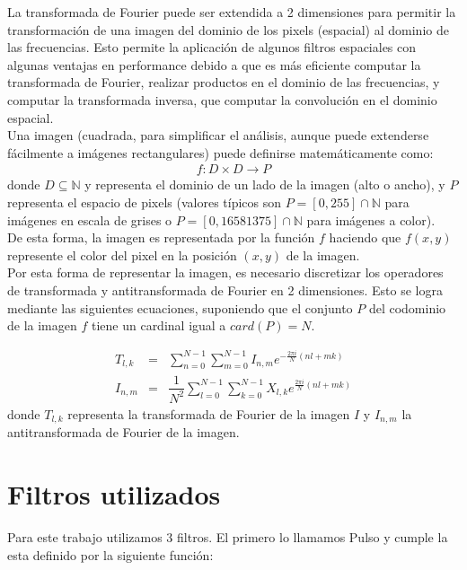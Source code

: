 \documentclass[11pt,a4paper]{emulateapj}
\begin{document}
La transformada de Fourier puede ser extendida a 2 dimensiones para permitir la transformación de una imagen 
del dominio de los pixels (espacial) al dominio de las frecuencias. Esto permite la aplicación de algunos filtros
espaciales con algunas ventajas en performance debido a que es más eficiente computar la transformada
de Fourier, realizar productos en el dominio de las frecuencias, y computar la transformada inversa,
que computar la convolución en el dominio espacial.\citet*{bou98} \\

Una imagen (cuadrada, para simplificar el análisis, aunque puede extenderse fácilmente a imágenes rectangulares)
puede definirse matemáticamente como:
\begin{eqnarray}
f:D \times D \rightarrow P
\end{eqnarray}
donde $D \subseteq  \mathbb{N} $ y representa el dominio de un lado de la imagen (alto o ancho), 
y $P$ representa el espacio de pixels (valores típicos son $P=[0,255]\cap\mathbb{N}$ para imágenes
en escala de grises o $P=[0,16581375]\cap\mathbb{N}$ para imágenes a color). \\

De esta forma, la imagen es representada por la función $f$ haciendo que $f(x,y)$ represente el color
del pixel en la posición $(x,y)$ de la imagen. \\

Por esta forma de representar la imagen, es necesario discretizar los operadores de transformada y 
antitransformada de Fourier en 2 dimensiones. Esto se logra mediante las siguientes ecuaciones, suponiendo que el conjunto $P$ del codominio de la imagen $f$ tiene un cardinal igual a $card(P)= N$.

\begin{eqnarray}
T_{l,k} &=& \sum_{n=0}^{N-1}\sum_{m=0}^{N-1} I_{n,m}e^{-\frac{2\pi i}{N}(nl+mk)} \\
I_{n,m} &=& \dfrac{1}{N^2}\sum_{l=0}^{N-1}\sum_{k=0}^{N-1} X_{l,k}e^{\frac{2\pi i}{N}(nl+mk)} 
\end{eqnarray}
donde $T_{l,k} $ representa la transformada de Fourier de la imagen $I$ y $I_{n,m} $ la antitransformada de Fourier de la imagen.\\


\section{Filtros utilizados}
\label{sec:sec2}
Para este trabajo utilizamos 3 filtros. El primero lo llamamos Pulso y cumple la esta definido por la siguiente función:
\end{document}
